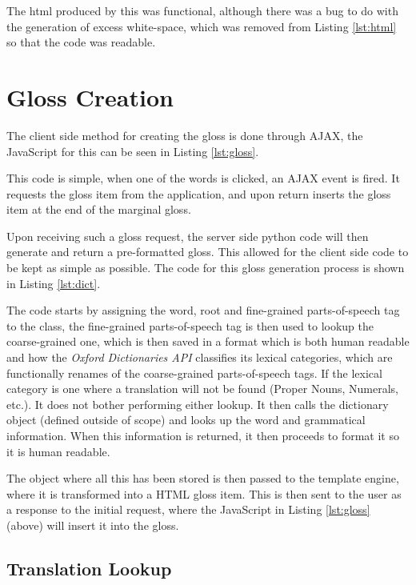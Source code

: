 

The html produced by this was functional, although there was a bug to do with the generation of excess white-space, which was removed from Listing \ref{lst:html} so that the code was readable. 

\section{Gloss Creation}

The client side method for creating the gloss is done through AJAX, the JavaScript for this can be seen in Listing \ref{lst:gloss}.



This code is simple, when one of the words is clicked, an AJAX event is fired. It requests the gloss item from the application, and upon return inserts the gloss item at the end of the marginal gloss.

Upon receiving such a gloss request, the server side python code will then generate and return a pre-formatted gloss. This allowed for the client side code to be kept as simple as possible. The code for this gloss generation process is shown in Listing \ref{lst:dict}.



The code starts by assigning the word, root and fine-grained parts-of-speech tag to the class, the fine-grained parts-of-speech tag is then used to lookup the coarse-grained one, which is then saved in a format which is both human readable and how the \textit{Oxford Dictionaries API} classifies its lexical categories, which are functionally renames of the coarse-grained parts-of-speech tags.  If the lexical category is one where a translation will not be found (Proper Nouns, Numerals, etc.). It does not bother performing either lookup. It then calls the dictionary object (defined outside of scope) and looks up the word and grammatical information. When this information is returned, it then proceeds to format it so it is human readable.

The object where all this has been stored is then passed to the template engine, where it is transformed into a HTML gloss item. This is then sent to the user as a response to the initial request, where the JavaScript in Listing \ref{lst:gloss} (above) will insert it into the gloss. 

\subsection{Translation Lookup}


